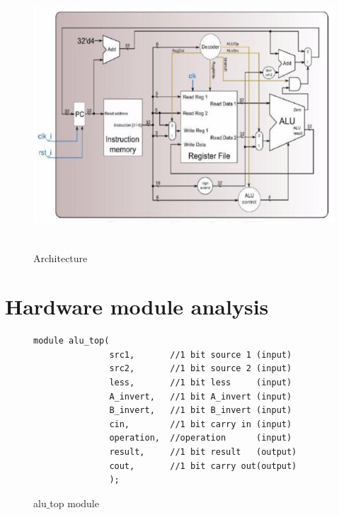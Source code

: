 \documentclass[12pt,a4paper]{article}
\theoremstyle{definition}
\begin{document}
\begin{figure}[H]
\centering
\includegraphics[height=10cm]{fig/cpu.png}
\caption{Architecture}
\label{fig:archi}
\end{figure}


\section{Hardware module analysis}

\begin{figure}[H]
\centering
\begin{lstlisting}[caption={}]
module alu_top(
               src1,       //1 bit source 1 (input)
               src2,       //1 bit source 2 (input)
               less,       //1 bit less     (input)
               A_invert,   //1 bit A_invert (input)
               B_invert,   //1 bit B_invert (input)
               cin,        //1 bit carry in (input)
               operation,  //operation      (input)
               result,     //1 bit result   (output)
               cout,       //1 bit carry out(output)
               );
\end{lstlisting}
\caption{alu$\_$top module}
\label{fig:alu_top_}
\end{figure}
\end{document}
